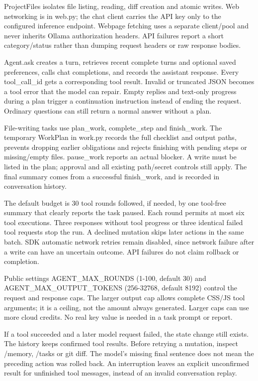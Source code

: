 ProjectFiles isolates file listing, reading, diff creation and atomic writes. Web networking is in web.py; the chat client carries the API key only to the configured inference endpoint. Webpage fetching uses a separate client/pool and never inherits Ollama authorization headers. API failures report a short category/status rather than dumping request headers or raw response bodies.

Agent.ask creates a turn, retrieves recent complete turns and optional saved preferences, calls chat completions, and records the assistant response. Every tool\_call\_id gets a corresponding tool result. Invalid or truncated JSON becomes a tool error that the model can repair. Empty replies and text-only progress during a plan trigger a continuation instruction instead of ending the request. Ordinary questions can still return a normal answer without a plan.

File-writing tasks use plan\_work, complete\_step and finish\_work. The temporary WorkPlan in work.py records the full checklist and output paths, prevents dropping earlier obligations and rejects finishing with pending steps or missing/empty files. pause\_work reports an actual blocker. A write must be listed in the plan; approval and all existing path/secret controls still apply. The final summary comes from a successful finish\_work, and is recorded in conversation history.

The default budget is 30 tool rounds followed, if needed, by one tool-free summary that clearly reports the task paused. Each round permits at most six tool executions. Three responses without tool progress or three identical failed tool requests stop the run. A declined mutation skips later actions in the same batch. SDK automatic network retries remain disabled, since network failure after a write can have an uncertain outcome. API failures do not claim rollback or completion.

Public settings AGENT\_MAX\_ROUNDS (1-100, default 30) and AGENT\_MAX\_OUTPUT\_TOKENS (256-32768, default 8192) control the request and response caps. The larger output cap allows complete CSS/JS tool arguments; it is a ceiling, not the amount always generated. Larger caps can use more cloud credits. No real key value is needed in a task prompt or report.

If a tool succeeded and a later model request failed, the state change still exists. The history keeps confirmed tool results. Before retrying a mutation, inspect /memory, /tasks or git diff. The model's missing final sentence does not mean the preceding action was rolled back. An interruption leaves an explicit unconfirmed result for unfinished tool messages, instead of an invalid conversation replay.

